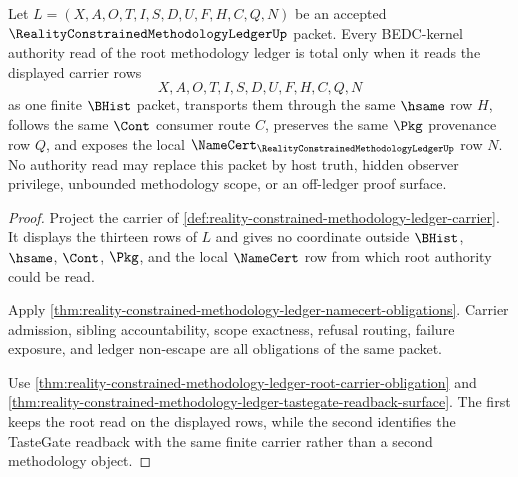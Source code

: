 \begin{theorem}
\label{thm:reality-constrained-methodology-ledger-root-authority-carrier-totality}
Let $L=(X,A,O,T,I,S,D,U,F,H,C,Q,N)$ be an accepted $\RealityConstrainedMethodologyLedgerUp$ packet. Every BEDC-kernel authority read of the root methodology ledger is total only when it reads the displayed carrier rows
$$
X,A,O,T,I,S,D,U,F,H,C,Q,N
$$
as one finite $\BHist$ packet, transports them through the same $\hsame$ row $H$, follows the same $\Cont$ consumer route $C$, preserves the same $\Pkg$ provenance row $Q$, and exposes the local $\NameCert_{\RealityConstrainedMethodologyLedgerUp}$ row $N$. No authority read may replace this packet by host truth, hidden observer privilege, unbounded methodology scope, or an off-ledger proof surface.
\end{theorem}
\begin{proof}
Project the carrier of \autoref{def:reality-constrained-methodology-ledger-carrier}. It displays the thirteen rows of $L$ and gives no coordinate outside $\BHist$, $\hsame$, $\Cont$, $\Pkg$, and the local $\NameCert$ row from which root authority could be read.

Apply \autoref{thm:reality-constrained-methodology-ledger-namecert-obligations}. Carrier admission, sibling accountability, scope exactness, refusal routing, failure exposure, and ledger non-escape are all obligations of the same packet.

Use \autoref{thm:reality-constrained-methodology-ledger-root-carrier-obligation} and \autoref{thm:reality-constrained-methodology-ledger-tastegate-readback-surface}. The first keeps the root read on the displayed rows, while the second identifies the TasteGate readback with the same finite carrier rather than a second methodology object.
\end{proof}

